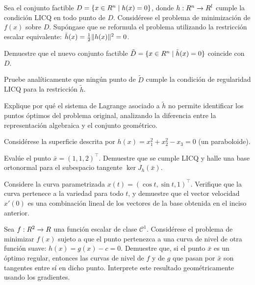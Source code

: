 \begin{exercise}\label{v1:ejer:2.5}
 Sea el conjunto factible $D = \{ x \in R^n \mid h(x) = 0 \}$, donde $h : R^n \to R^l$ cumple la condición LICQ en todo punto de $D$. Considérese el problema de minimización de $f(x)$ sobre $D$. Supóngase que se reformula el problema utilizando la restricción escalar equivalente: $\tilde{h}(x) = \frac{1}{2}\lVert h(x)\rVert^2 = 0$.
 \begin{enuthm}
 \item Demuestre que el nuevo conjunto factible $\tilde{D} = \{ x \in R^n \mid \tilde{h}(x) = 0 \}$ coincide con $D$.
 \item Pruebe analíticamente que ningún punto de $\tilde{D}$ cumple la condición de regularidad LICQ para la restricción $\tilde{h}$.
 \item Explique por qué el sistema de Lagrange asociado a $\tilde{h}$ no permite identificar los puntos óptimos del problema original, analizando la diferencia entre la representación algebraica y el conjunto geométrico.
 \end{enuthm}
\end{exercise}

\begin{exercise}\label{v1:ejer:2.6}
 Considérese la superficie descrita por $h(x) = x_1^2 + x_2^2 - x_3 = 0$ (un paraboloide).
 \begin{enuthm}
 \item Evalúe el punto $\bar{x} = (1, 1, 2)^\top$. Demuestre que se cumple LICQ y halle una base ortonormal para el subespacio tangente $\ker J_h(\bar{x})$.
 \item Considere la curva parametrizada $x(t) = (\cos t, \sin t, 1)^\top$. Verifique que la curva pertenece a la variedad para todo $t$, y demuestre que el vector velocidad $x'(0)$ es una combinación lineal de los vectores de la base obtenida en el inciso anterior.
 \end{enuthm}
\end{exercise}

\begin{exercise}\label{v1:ejer:2.7}
 Sea $f : R^2 \to R$ una función escalar de clase $\mathcal{C}^1$. Considérese el problema de minimizar $f(x)$ sujeto a que el punto pertenezca a una curva de nivel de otra función suave: $h(x) = g(x) - c = 0$. Demuestre que, si el punto $\bar{x}$ es un óptimo regular, entonces las curvas de nivel de $f$ y de $g$ que pasan por $\bar{x}$ son tangentes entre sí en dicho punto. Interprete este resultado geométricamente usando los gradientes.
\end{exercise}

